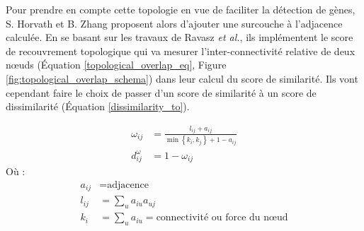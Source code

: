 
Pour prendre en compte cette topologie en vue de faciliter la détection de gènes, S. Horvath et B. Zhang proposent alors d'ajouter une surcouche à l'adjacence calculée. En se basant sur les travaux de Ravasz \textit{et al.}, ils implémentent le score de recouvrement topologique qui va mesurer l'inter-connectivité relative de deux nœuds (Équation \ref{topological_overlap_eq}, Figure \ref{fig:topological_overlap_schema}) dans leur calcul du score de similarité. Ils vont cependant faire le choix de passer d'un score de similarité à un score de dissimilarité (Équation \ref{dissimilarity_to}). 

\begin{align} 
    \omega_{i j} &= \frac{l_{i j}+a_{i j}}{\min \left\{k_{i}, k_{j}\right\}+1-a_{i j}} \label{topological_overlap_eq} \\ 
    d_{i j}^{\omega} &= 1-\omega_{i j} \label{dissimilarity_to}
\end{align}
Où :
\begin{align*}
    a_{i j} & = \text{adjacence} \\
    l_{i j} &= \sum_{u} a_{i u} a_{u j} \\
    k_{i} &= \sum_{u} a_{i u} = \text{connectivité ou force du nœud}
\end{align*}

